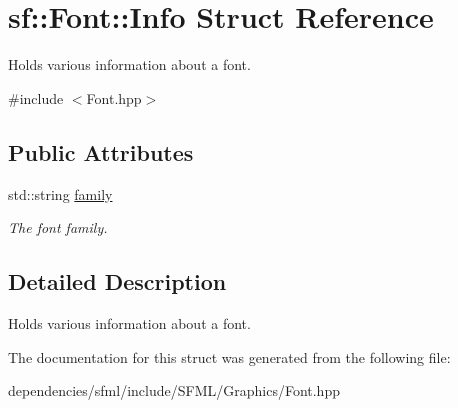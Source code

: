 \hypertarget{structsf_1_1_font_1_1_info}{}\section{sf\+:\+:Font\+:\+:Info Struct Reference}
\label{structsf_1_1_font_1_1_info}


Holds various information about a font.  




{\ttfamily \#include $<$Font.\+hpp$>$}

\subsection*{Public Attributes}
\begin{DoxyCompactItemize}
\item 
\mbox{\label{structsf_1_1_font_1_1_info_a008413b4b6cf621eb92668a11098a519}} 
std\+::string \hyperlink{structsf_1_1_font_1_1_info_a008413b4b6cf621eb92668a11098a519}{family}
\begin{DoxyCompactList}\small\item\em The font family. \end{DoxyCompactList}\end{DoxyCompactItemize}


\subsection{Detailed Description}
Holds various information about a font. 

The documentation for this struct was generated from the following file\+:\begin{DoxyCompactItemize}
\item 
dependencies/sfml/include/\+S\+F\+M\+L/\+Graphics/Font.\+hpp\end{DoxyCompactItemize}

